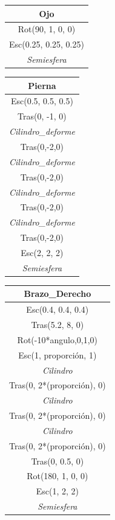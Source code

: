 \documentclass{article}
\begin{document}
\begin{table}[h!]
	\centering
	\label{3}
	\begin{tabular}{|c|}
		\hline
		\textbf{Ojo}\\ \hline
		Rot(90, 1, 0, 0)\\ \hline
		Esc(0.25, 0.25, 0.25)\\ \hline
		\textit{Semiesfera}\\ \hline
	\end{tabular}
\end{table}



\begin{table}[h!]
	\centering
	\label{5}
	\begin{tabular}{|c|}
		\hline
		\textbf{Pierna}\\ \hline
		Esc(0.5, 0.5, 0.5)\\ \hline
		Tras(0, -1, 0)\\ \hline
		\textit{Cilindro\_deforme}\\ \hline
		Tras(0,-2,0)\\ \hline
		\textit{Cilindro\_deforme}\\ \hline
		Tras(0,-2,0)\\ \hline
		\textit{Cilindro\_deforme}\\ \hline
		Tras(0,-2,0)\\ \hline
		\textit{Cilindro\_deforme}\\ \hline
		Tras(0,-2,0)\\ \hline
		Esc(2, 2, 2)\\ \hline
		\textit{Semiesfera}\\ \hline
	\end{tabular}
\end{table}

\begin{table}[h!]
	\centering
	\label{6}
	\begin{tabular}{|c|}
		\hline
		\textbf{Brazo\_Derecho}\\ \hline
		Esc(0.4, 0.4, 0.4)\\ \hline
		Tras(5.2, 8, 0)\\ \hline
		Rot(-10*angulo,0,1,0)\\ \hline
		Esc(1, proporción, 1)\\ \hline
		\textit{Cilindro}\\ \hline
		Tras(0, 2*(proporción), 0)\\ \hline
		\textit{Cilindro}\\ \hline
		Tras(0, 2*(proporción), 0)\\ \hline
		\textit{Cilindro}\\ \hline
		Tras(0, 2*(proporción), 0)\\ \hline
		Tras(0, 0.5, 0)\\ \hline
		Rot(180, 1, 0, 0)\\ \hline
		Esc(1, 2, 2)\\ \hline
		\textit{Semiesfera}\\ \hline
	\end{tabular}
\end{table}
\end{document}

